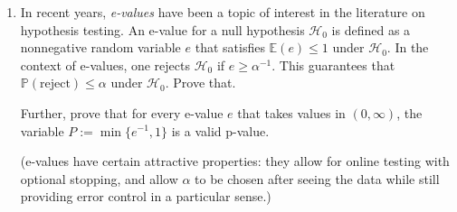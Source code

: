 \documentclass[11pt]{article}
\theoremstyle{plain}
\theoremstyle{definition}
\newcommand{\Hy}{\mathcal{H}}
\newcommand{\pr}{\mathbb{P}}
\begin{document}
\begin{enumerate}
\item In recent years, \emph{e-values} have been a topic of interest in the literature on hypothesis testing. An e-value for a null hypothesis $\Hy_0$ is defined as a nonnegative random variable $e$ that satisfies $\mathbb{E}(e)\leq 1$ under $\Hy_0$. 
In the context of e-values, one rejects $\Hy_0$ if $e\geq \alpha^{-1}$. This guarantees that $\pr(\text{reject})\leq\alpha$ under $\Hy_0$. Prove that.

Further, prove that for every e-value $e$ that takes values in $(0,\infty)$,  the variable  $P:=\min\{e^{-1},1\}$ is a valid p-value.

(e-values have certain attractive properties: they allow for online testing with optional stopping, and allow  $\alpha$ to be chosen after seeing the data while still providing error control in a particular sense.)








\end{enumerate}
\end{document}
